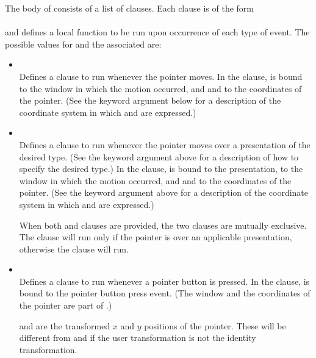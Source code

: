 The body of  consists of a list of clauses.  Each clause is
of the form
\\
\\
and defines a local function to be run upon occurrence of each type of event.
The possible values for  and the associated 
are:

\begin{itemize}
\item { } \\
Defines a clause to run whenever the pointer moves.  In the clause, 
is bound to the window in which the motion occurred, and  and  to
the coordinates of the pointer. (See the keyword argument  below
for a description of the coordinate system in which  and  are
expressed.)

\item { } \\
Defines a clause to run whenever the pointer moves over a presentation of the
desired type.  (See the keyword argument  above for a
description of how to specify the desired type.)  In the clause,
 is bound to the presentation,  to the window in
which the motion occurred, and  and  to the coordinates of the
pointer.  (See the keyword argument  above for a description of
the coordinate system in which  and  are expressed.)

When both  and  clauses are provided, the
two clauses are mutually exclusive.  The  clause will run only
if the pointer is over an applicable presentation, otherwise the
 clause will run.

\item { } \\
Defines a clause to run whenever a pointer button is pressed. In the clause,
 is bound to the pointer button press event. (The window and the
coordinates of the pointer are part of .)

 and  are the transformed $x$ and $y$ positions of the pointer.
These will be different from  and  if
the user transformation is not the identity transformation.


\end{itemize}

